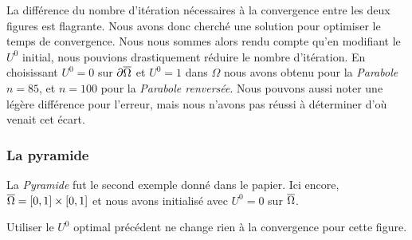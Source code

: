 La différence du nombre d'itération nécessaires à la convergence entre les deux figures est flagrante. Nous avons donc cherché une solution pour optimiser le temps de convergence. Nous nous sommes alors rendu compte qu'en modifiant le $U^0$ initial, nous pouvions drastiquement réduire le nombre d'itération. En choisissant $U^0=0$ sur $\mathop{}\!{\partial} \overline{\Omega}$ et $U^0=1$ dans $\Omega$ nous avons obtenu pour la \textit{Parabole} $n=85$, et $n=100$ pour la \textit{Parabole renversée}. 
Nous pouvons aussi noter une légère différence pour l'erreur, mais nous n'avons pas réussi à déterminer d'où venait cet écart.

\subsubsection{La pyramide}
La \textit{Pyramide} fut le second exemple donné dans le papier. Ici encore, $\overline{\Omega} = \mathopen{}\left[0,1\right]\mathclose{}\times \mathopen{}\left[0,1\right]\mathclose{}$ et nous avons initialisé avec $U^0 = 0$ sur $\overline{\Omega}$. 
\begin{noremark}
    Utiliser le $U^0$ optimal précédent ne change rien à la convergence pour cette figure.
\end{noremark}

